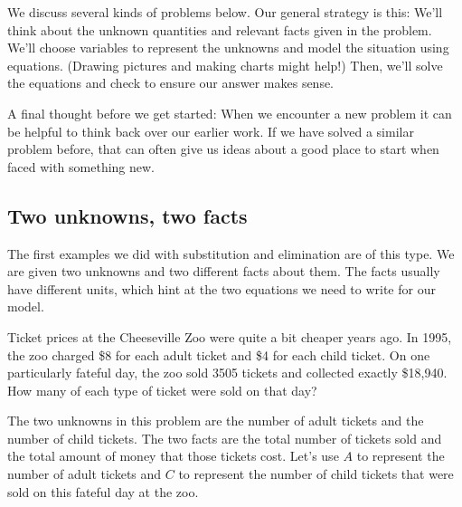 We discuss several kinds of problems below. Our general strategy is this: We'll think about the unknown quantities and relevant facts given in the problem. We'll choose variables to represent the unknowns and model the situation using equations. (Drawing pictures and making charts might help!) Then, we'll solve the equations and check to ensure our answer makes sense.

A final thought before we get started: When we encounter a new problem it can be helpful to think back over our earlier work. If we have solved a similar problem before, that can often give us ideas about a good place to start when faced with something new.

\subsection{Two unknowns, two facts}

The first examples we did with substitution and elimination are of this type. We are given two unknowns and two different facts about them. The facts usually have different units, which hint at the two equations we need to write for our model.



\begin{boxex}
Ticket prices at the Cheeseville Zoo were quite a bit cheaper years ago. In 1995, the zoo charged \$8 for each adult ticket and \$4 for each child ticket. On one particularly fateful day, the zoo sold 3505 tickets and collected exactly \$18,940. How many of each type of ticket were sold on that day?
\end{boxex}

The two unknowns in this problem are the number of adult tickets and the number of child tickets. The two facts are the total number of tickets sold and the total amount of money that those tickets cost. Let's use $A$ to represent the number of adult tickets and $C$ to represent the number of child tickets that were sold on this fateful day at the zoo.


